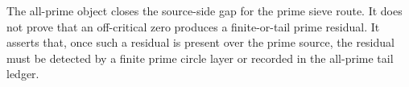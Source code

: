 \begin{principle}
\label{prin:rh-all-prime-source-audit-boundary}
The all-prime object closes the source-side gap for the prime sieve
route.  It does not prove that an off-critical zero produces a
finite-or-tail prime residual.  It asserts that, once such a residual
is present over the prime source, the residual must be detected by a
finite prime circle layer or recorded in the all-prime tail ledger.
\end{principle}
